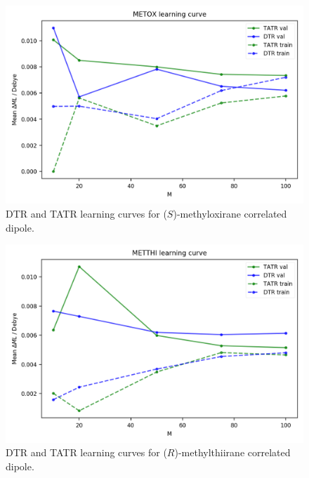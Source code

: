 \begin{figure}
    \centering
    \includegraphics[scale=1.0]{p2/figures/si/METOX_learn_d.png}
    \caption{DTR and TATR learning curves for ($\textit{S}$)-methyloxirane correlated dipole.}
\end{figure}

\begin{figure}
    \centering
    \includegraphics[scale=1.0]{p2/figures/si/METTHI_learn_d.png}
    \caption{DTR and TATR learning curves for ($\textit{R}$)-methylthiirane correlated dipole.}
\end{figure}


